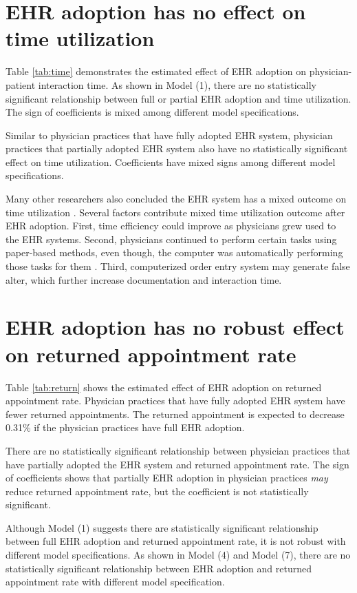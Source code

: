 \documentclass[12pt]{report}
\begin{document}
\section{EHR adoption has no effect on time utilization}
Table \ref{tab:time} demonstrates the estimated effect of EHR adoption on physician-patient interaction time. As shown in Model (1), there are no statistically significant relationship between full or partial EHR adoption and time utilization. The sign of coefficients is mixed among different model specifications.

Similar to physician practices that have fully adopted EHR system, physician practices that partially adopted EHR system also have no statistically significant effect on time utilization. Coefficients have mixed signs among different model specifications.

Many other researchers also concluded the EHR system has a mixed outcome on time utilization \citep{makoul2001use,poissant2005impact}. Several factors contribute mixed time utilization outcome after EHR adoption. First, time efficiency could improve as physicians grew used to the EHR systems. Second, physicians continued to perform certain tasks using paper-based methods, even though, the computer was automatically performing those tasks for them \citep{overhage2001controlled}. Third, computerized order entry system may generate false alter, which further increase documentation and interaction time.

\section{EHR adoption has no robust effect on returned appointment rate}

Table \ref{tab:return} shows the estimated effect of EHR adoption on returned appointment rate. Physician practices that have fully adopted EHR system have fewer returned appointments. The returned appointment is expected to decrease 0.31\% if the physician practices have full EHR adoption. 

There are no statistically significant relationship between physician practices that have partially adopted the EHR system and returned appointment rate. The sign of coefficients shows that partially EHR adoption in physician practices \textit{may} reduce returned appointment rate, but the coefficient is not statistically significant.

Although Model (1) suggests there are statistically significant relationship between full EHR adoption and returned appointment rate, it is not robust with different model specifications.  As shown in Model (4) and Model (7), there are no statistically significant relationship between EHR adoption and returned appointment rate with different model specification.
\end{document}
